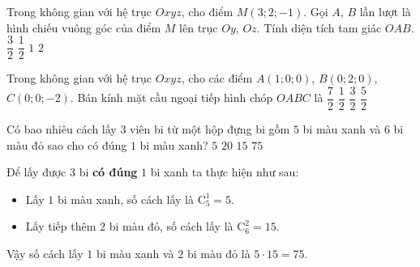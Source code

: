 \begin{ex}[2H3B1-1]%
	Trong không gian với hệ trục $Oxyz$, cho điểm $M\left(3; 2; -1\right)$. Gọi $ A $, $ B $ lần lượt là hình chiếu vuông góc của điểm $M$ lên trục $Oy$, $ Oz $. Tính diện tích tam giác $ OAB $.
	\choice
	{$\dfrac{3}{2}$}
	{$\dfrac{1}{2}$}
	{\True $1$}
	{$2$}
\end{ex}
\begin{ex}[2H3B1-3]%
	Trong không gian với hệ trục $Oxyz$, cho các điểm $A(1; 0; 0)$, $B(0; 2; 0)$, $C(0; 0; -2)$. Bán kính mặt cầu ngoại tiếp hình chóp $OABC$ là
	\choice
	{$\dfrac{7}{2}$}
	{$\dfrac{1}{2}$}
	{\True $\dfrac{3}{2}$}
	{$\dfrac{5}{2}$}
\end{ex}
\begin{ex}[1D2Y2-1]%
	Có bao nhiêu cách lấy $3$ viên bi từ một hộp đựng bi gồm $5$ bi màu xanh và $6$ bi màu đỏ sao cho có đúng $1$ bi màu xanh?
	\choice
	{$5$}
	{$20$}
	{$15$}
	{\True $75$}
	\loigiai
	{Để lấy được $ 3 $ bi \textbf{có đúng} $ 1 $ bi xanh ta thực hiện như sau:
		\begin{itemize}
			\item Lấy $1$ bi màu xanh, số cách lấy là $\mathrm{C}^1_5=5$.
			\item Lấy tiếp thêm $ 2 $ bi màu đỏ, số cách lấy là $\mathrm{C}^2_6=15$.
		\end{itemize}
		Vậy số cách lấy $1$ bi màu xanh và $2$ bi màu đỏ là $5 \cdot 15 = 75$.
	}
\end{ex}
